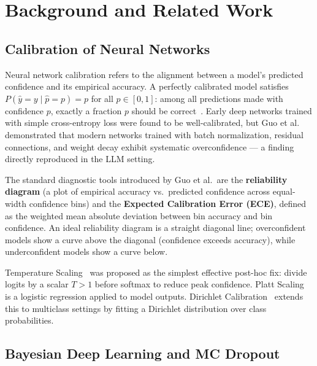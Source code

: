 \documentclass[conference]{IEEEtran}
\begin{document}
\section{Background and Related Work}
\label{sec:related}

\subsection{Calibration of Neural Networks}

Neural network calibration refers to the alignment between a model's
predicted confidence and its empirical accuracy. A perfectly calibrated
model satisfies $P(\hat{y}=y \mid \hat{p}=p) = p$ for all
$p \in [0,1]$: among all predictions made with confidence $p$, exactly
a fraction $p$ should be correct~\cite{degroot1983comparison}. Early
deep networks trained with simple cross-entropy loss were found to be
well-calibrated, but Guo et al.~\cite{guo2017calibration} demonstrated
that modern networks trained with batch normalization, residual
connections, and weight decay exhibit systematic overconfidence --- a
finding directly reproduced in the LLM setting.

The standard diagnostic tools introduced by Guo et al.\ are the
\textbf{reliability diagram} (a plot of empirical accuracy vs.\
predicted confidence across equal-width confidence bins) and the
\textbf{Expected Calibration Error (ECE)}, defined as the
weighted mean absolute deviation between bin accuracy and bin
confidence. An ideal reliability diagram is a straight diagonal line;
overconfident models show a curve above the diagonal (confidence
exceeds accuracy), while underconfident models show a curve below.

Temperature Scaling~\cite{guo2017calibration} was proposed as the
simplest effective post-hoc fix: divide logits by a scalar $T>1$
before softmax to reduce peak confidence. Platt Scaling~\cite{platt1999probabilistic}
is a logistic regression applied to model outputs. Dirichlet
Calibration~\cite{kull2019beyond} extends this to multiclass settings
by fitting a Dirichlet distribution over class probabilities.

\subsection{Bayesian Deep Learning and MC Dropout}
\end{document}
